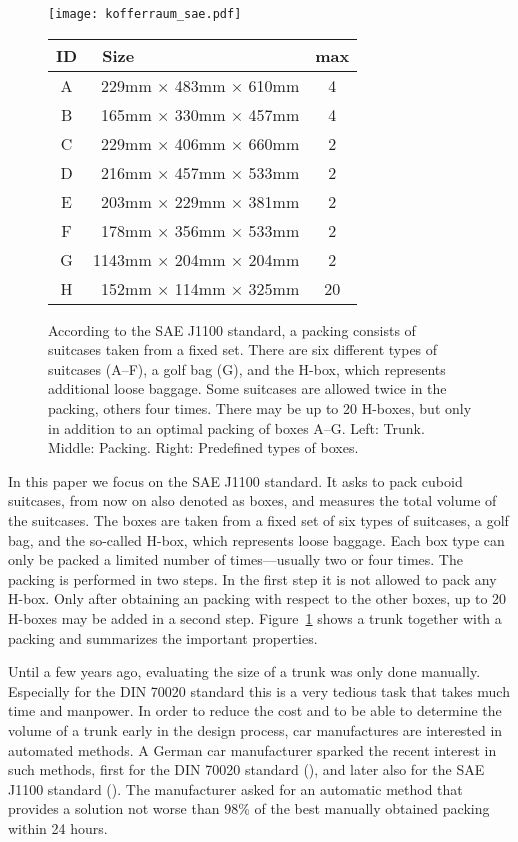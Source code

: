 \documentclass{article}
\begin{document}
\begin{figure}[t]
\center
\texttt{[image: kofferraum\_sae.pdf]}
\hfill
\begin{tabular}[b]{|c|r|c|}
\hline
ID & \multicolumn{1}{|l|}{\ Size} & max \\
\hline
A & 229mm $\times$ 483mm $\times$ 610mm & 4 \\
B & 165mm $\times$ 330mm $\times$ 457mm & 4 \\
C & 229mm $\times$ 406mm $\times$ 660mm & 2 \\
D & 216mm $\times$ 457mm $\times$ 533mm & 2 \\
E & 203mm $\times$ 229mm $\times$ 381mm & 2 \\
F & 178mm $\times$ 356mm $\times$ 533mm & 2 \\
\hline
G & 1143mm $\times$ 204mm $\times$ 204mm & 2 \\
\hline
H & 152mm $\times$ 114mm $\times$ 325mm & 20 \\
\hline
\end{tabular}
\caption{
\label{fig:boxset}
According to the SAE J1100 standard, a packing consists of suitcases
taken from a fixed set. There are six different types of suitcases
(A--F), a golf bag (G), and the H-box, which represents additional
loose baggage. Some suitcases are allowed twice in the packing, others
four times. There may be up to 20 H-boxes, but only in addition to an
optimal packing of boxes A--G. Left: Trunk. Middle: Packing. Right:
Predefined types of boxes.}
\end{figure}

In this paper we focus on the SAE J1100 standard. It asks to pack
cuboid suitcases, from now on also denoted as boxes, and measures the
total volume of the suitcases. The boxes are taken from a fixed set of
six types of suitcases, a golf bag, and the so-called H-box, which
represents loose baggage. Each box type can only be packed a limited
number of times---usually two or four times. The packing is performed
in two steps. In the first step it is not allowed to pack any
H-box. Only after obtaining an packing with respect to the other
boxes, up to 20 H-boxes may be added in a second
step. Figure~\ref{fig:boxset} shows a trunk together with a packing
and summarizes the important properties.

Until a few years ago, evaluating the size of a trunk was only done
manually. Especially for the DIN 70020 standard this is a very tedious
task that takes much time and manpower. In order to reduce the cost
and to be able to determine the volume of a trunk early in the design
process, car manufactures are interested in automated methods. A
German car manufacturer sparked the recent interest in such methods,
first for the DIN 70020 standard
(\cite{efkrs-05,Reichel2003,Karr04,Neum06,Reichel06,Ries05}), and
later also for the SAE J1100 standard (\cite{absw-07,cd-03}). The
manufacturer asked for an automatic method that provides a solution
not worse than 98\% of the best manually obtained packing within 24 hours.
\end{document}
